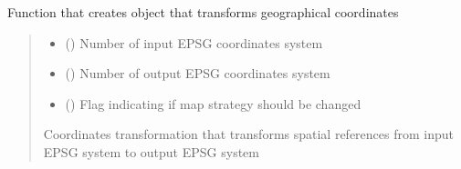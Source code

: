 \documentclass[letterpaper,10pt,english]{sphinxmanual}
\begin{document}
\begin{fulllineitems}
\label{\detokenize{geo_utilities:geo_utilities.create_coords_transform}}
\pysigstartsignatures
{}
\pysigstopsignatures
\sphinxAtStartPar
Function that creates object that transforms geographical coordinates
\begin{quote}\begin{description}
\begin{itemize}
\item {} 
\sphinxAtStartPar
{} () \textendash{} Number of input EPSG coordinates system

\item {} 
\sphinxAtStartPar
{} () \textendash{} Number of output EPSG coordinates system

\item {} 
\sphinxAtStartPar
{} () \textendash{} Flag indicating if map strategy should be changed

\end{itemize}

\sphinxAtStartPar
{}

\sphinxAtStartPar
Coordinates transformation that transforms spatial references from input EPSG system to output EPSG system

\end{description}\end{quote}

\end{fulllineitems}

\end{document}
